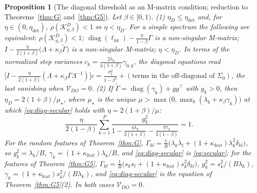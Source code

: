 \documentclass[11pt]{article}
\newtheorem{proposition}[theorem]{Proposition}
\theoremstyle{remark}
\begin{document}
\begin{proposition}[The diagonal threshold as an M-matrix condition; reduction to Theorems~\ref{thm:G} and~\ref{thm:G5}]\label{prop:diag-M}
Let $\beta\in[0,1)$. (1) $\eta_D\le\eta_{\mathrm{det}}$ and, for $\eta\in(0,\eta_{\mathrm{det}})$, $\rho(\mathcal K^D_{\eta,\beta})<1\iff\eta<\eta_D$. For a simple spectrum the following are equivalent: $\rho(\mathcal K^D_{\eta,\beta})<1$; $\operatorname{diag}(\ell_{kk})-\frac{\eta}{1-\beta}\Gamma$ is a non-singular M-matrix; $I-\frac{\eta}{2(1+\beta)}\big(\Lambda+\kappa_\beta\widetilde\Gamma\big)$ is a non-singular M-matrix; $\eta<\eta_D$. In terms of the normalized step variances $c_k=\frac{2\lambda_k}{\eta(1+\beta)}\gamma_{0,k}$, the diagonal equations read $\big[I-\frac{\eta}{2(1+\beta)}(\Lambda+\kappa_\beta\Gamma\Lambda^{-1})\big]c=\frac{\sigma^2_{\xi}}{1-\beta^2}+(\text{terms in the off-diagonal of }\Sigma_0)$, the last vanishing when $\mathcal V_{DO}=0$.
(2) If $\widetilde\Gamma=\operatorname{diag}(\gamma_k)+gg^\top$ with $g_k>0$, then $\eta_D=2(1+\beta)/\mu_\star$, where $\mu_\star$ is the unique $\mu>\max\big(0,\max_k(\lambda_k+\kappa_\beta\gamma_k)\big)$ at which \eqref{eq:diag-secular} holds with $\eta=2(1+\beta)/\mu$:
\begin{equation}\label{eq:diag-secular}
\frac{\eta}{2(1-\beta)}\sum_{k=1}^P\frac{g_k^2}{1-\frac{\eta\lambda_k}{2(1+\beta)}-\frac{\eta\gamma_k}{2(1-\beta)}}=1 .
\end{equation}
For the random features of Theorem~\ref{thm:G}, $\Gamma_{kl}=\frac1B\big(\lambda_k\lambda_l+(1+\kappa_{\mathrm{feat}})\lambda_k^2\delta_{kl}\big)$, so $g_k^2=\lambda_k/B$, $\gamma_k=(1+\kappa_{\mathrm{feat}})\lambda_k/B$, and \eqref{eq:diag-secular} is \eqref{eq:secular}; for the features of Theorem~\ref{thm:G5}, $\Gamma_{kl}=\frac1B\big(s_ks_l+(1+\kappa_{\mathrm{feat}})s_k^2\delta_{kl}\big)$, $g_k^2=s_k^2/(B\lambda_k)$, $\gamma_k=(1+\kappa_{\mathrm{feat}})s_k^2/(B\lambda_k)$, and \eqref{eq:diag-secular} is the equation of Theorem~\ref{thm:G5}(2). In both cases $\mathcal V_{DO}=0$.
\end{proposition}
\end{document}
